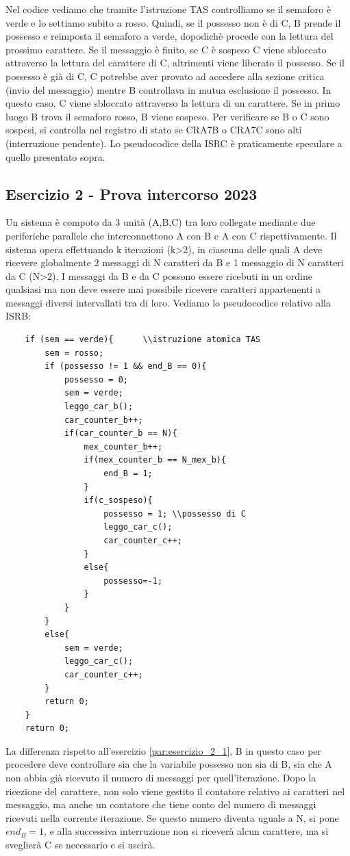 Nel codice vediamo che tramite l'istruzione TAS controlliamo se il semaforo è verde e lo settiamo subito a rosso. Quindi, se il possesso non è di C, B prende il possesso e reimposta il semaforo a verde, dopodichè procede con la lettura del prossimo carattere. Se il messaggio è finito, se C è sospeso C viene sbloccato attraverso la lettura del carattere di C, altrimenti viene liberato il possesso. Se il possesso è già di C, C potrebbe aver provato ad accedere alla sezione critica (invio del messaggio) mentre B controllava in mutua esclusione il possesso. In questo caso, C viene sbloccato attraverso la lettura di un carattere. Se in primo luogo B trova il semaforo rosso, B viene sospeso.
Per verificare se B o C sono sospesi, si controlla nel registro di stato se CRA7B o CRA7C sono alti (interruzione pendente). 
Lo pseudocodice della ISRC è praticamente speculare a quello presentato sopra. 


\subsection{Esercizio 2 - Prova intercorso 2023}
Un sistema è compoto da 3 unità (A,B,C) tra loro collegate mediante due periferiche parallele che interconnettono A con B e A con C rispettivamente. Il sistema opera effettuando k iterazioni (k>2), in ciascuna delle quali A deve ricevere globalmente 2 messaggi di N caratteri da B e 1 messaggio di N caratteri da C (N>2). I messaggi da B e da C possono essere ricebuti in un ordine qualsiasi ma non deve essere mai possibile ricevere caratteri appartenenti a messaggi diversi intervallati tra di loro.
Vediamo lo pseudocodice relativo alla ISRB:

\begin{lstlisting}
    if (sem == verde){      \\istruzione atomica TAS
        sem = rosso;
        if (possesso != 1 && end_B == 0){ 
            possesso = 0;
            sem = verde;
            leggo_car_b();
            car_counter_b++;
            if(car_counter_b == N){
                mex_counter_b++;
                if(mex_counter_b == N_mex_b){
                    end_B = 1;
                }
                if(c_sospeso){
                    possesso = 1; \\possesso di C
                    leggo_car_c();
                    car_counter_c++;
                }
                else{
                    possesso=-1;
                }
            }
        }
        else{
            sem = verde;
            leggo_car_c();
            car_counter_c++;
        }
        return 0;
    }
    return 0;
\end{lstlisting}

La differenza rispetto all'esercizio \ref{par:esercizio_2_1}, B in questo caso per procedere deve controllare sia che la variabile possesso non sia di B, sia che A non abbia già ricevuto il numero di messaggi per quell'iterazione. Dopo la ricezione del carattere, non solo viene gestito il contatore relativo ai caratteri nel messaggio, ma anche un contatore che tiene conto del numero di messaggi ricevuti nella corrente iterazione. Se questo numero diventa uguale a N, si pone $end_B = 1$, e alla successiva interruzione non si riceverà alcun carattere, ma si sveglierà C se necessario e si uscirà. 
